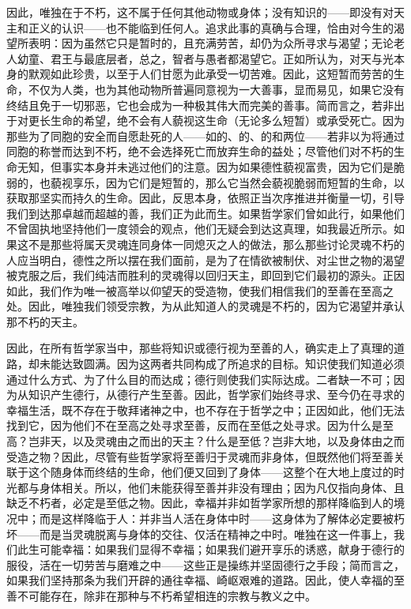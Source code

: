 因此，唯独在于不朽，这不属于任何其他动物或身体；没有知识的——即没有对天主和正义的认识——也不能临到任何人。追求此事的真确与合理，恰由对今生的渴望所表明：因为虽然它只是暂时的，且充满劳苦，却仍为众所寻求与渴望；无论老人幼童、君王与最底层者，总之，智者与愚者都渴望它。正如所认为，对天与光本身的默观如此珍贵，以至于人们甘愿为此承受一切苦难。因此，这短暂而劳苦的生命，不仅为人类，也为其他动物所普遍同意视为一大善事，显而易见，如果它没有终结且免于一切邪恶，它也会成为一种极其伟大而完美的善事。简而言之，若非出于对更长生命的希望，绝不会有人藐视这生命（无论多么短暂）或承受死亡。因为那些为了同胞的安全而自愿赴死的人——如的、的、的和两位——若非以为将通过同胞的称誉而达到不朽，绝不会选择死亡而放弃生命的益处；尽管他们对不朽的生命无知，但事实本身并未逃过他们的注意。因为如果德性藐视富贵，因为它们是脆弱的，也藐视享乐，因为它们是短暂的，那么它当然会藐视脆弱而短暂的生命，以获取那坚实而持久的生命。因此，反思本身，依照正当次序推进并衡量一切，引导我们到达那卓越而超越的善，我们正为此而生。如果哲学家们曾如此行，如果他们不曾固执地坚持他们一度领会的观点，他们无疑会到达这真理，如我最近所示。如果这不是那些将属天灵魂连同身体一同熄灭之人的做法，那么那些讨论灵魂不朽的人应当明白，德性之所以摆在我们面前，是为了在情欲被制伏、对尘世之物的渴望被克服之后，我们纯洁而胜利的灵魂得以回归天主，即回到它们最初的源头。正因如此，我们作为唯一被高举以仰望天的受造物，使我们相信我们的至善在至高之处。因此，唯独我们领受宗教，为从此知道人的灵魂是不朽的，因为它渴望并承认那不朽的天主。\par

因此，在所有哲学家当中，那些将知识或德行视为至善的人，确实走上了真理的道路，却未能达致圆满。因为这两者共同构成了所追求的目标。知识使我们知道必须通过什么方式、为了什么目的而达成；德行则使我们实际达成。二者缺一不可；因为从知识产生德行，从德行产生至善。因此，哲学家们始终寻求、至今仍在寻求的幸福生活，既不存在于敬拜诸神之中，也不存在于哲学之中；正因如此，他们无法找到它，因为他们不在至高之处寻求至善，反而在至低之处寻求。因为什么是至高？岂非天，以及灵魂由之而出的天主？什么是至低？岂非大地，以及身体由之而受造之物？因此，尽管有些哲学家将至善归于灵魂而非身体，但既然他们将至善关联于这个随身体而终结的生命，他们便又回到了身体——这整个在大地上度过的时光都与身体相关。所以，他们未能获得至善并非没有理由；因为凡仅指向身体、且缺乏不朽者，必定是至低之物。因此，幸福并非如哲学家所想的那样降临到人的境况中；而是这样降临于人：并非当人活在身体中时——这身体为了解体必定要被朽坏——而是当灵魂脱离与身体的交往、仅活在精神之中时。唯独在这一件事上，我们此生可能幸福：如果我们显得不幸福；如果我们避开享乐的诱惑，献身于德行的服役，活在一切劳苦与磨难之中——这些正是操练并坚固德行之手段；简而言之，如果我们坚持那条为我们开辟的通往幸福、崎岖艰难的道路。因此，使人幸福的至善不可能存在，除非在那种与不朽希望相连的宗教与教义之中。\par

